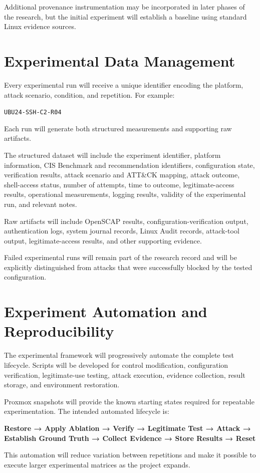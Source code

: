 \documentclass[11pt]{article}
\begin{document}
Additional provenance instrumentation may be incorporated in later
phases of the research, but the initial experiment will establish a
baseline using standard Linux evidence sources.
\section{Experimental Data Management}
\label{sec:orgf8dba1f}
Every experimental run will receive a unique identifier encoding the
platform, attack scenario, condition, and repetition. For example:

\texttt{UBU24-SSH-C2-R04}

Each run will generate both structured measurements and supporting raw
artifacts.

The structured dataset will include the experiment identifier, platform
information, CIS Benchmark and recommendation identifiers, configuration
state, verification results, attack scenario and ATT\&CK mapping, attack
outcome, shell-access status, number of attempts, time to outcome,
legitimate-access results, operational measurements, logging results,
validity of the experimental run, and relevant notes.

Raw artifacts will include OpenSCAP results, configuration-verification
output, authentication logs, system journal records, Linux Audit
records, attack-tool output, legitimate-access results, and other
supporting evidence.

Failed experimental runs will remain part of the research record and
will be explicitly distinguished from attacks that were successfully
blocked by the tested configuration.
\section{Experiment Automation and Reproducibility}
\label{sec:org7e87aad}
The experimental framework will progressively automate the complete test
lifecycle. Scripts will be developed for control modification,
configuration verification, legitimate-use testing, attack execution,
evidence collection, result storage, and environment restoration.

Proxmox snapshots will provide the known starting states required for
repeatable experimentation. The intended automated lifecycle is:


\textbf{Restore → Apply Ablation → Verify → Legitimate Test → Attack →
Establish Ground Truth → Collect Evidence → Store Results → Reset}


This automation will reduce variation between repetitions and make it
possible to execute larger experimental matrices as the project expands.
\end{document}
